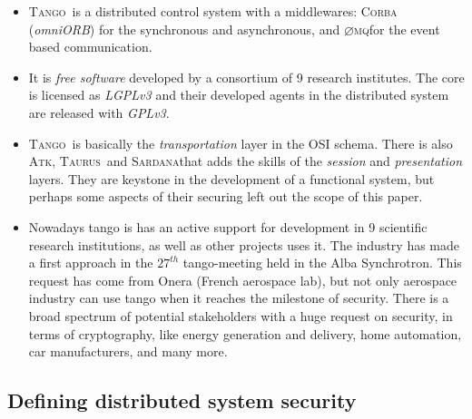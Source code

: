 \documentclass[10pt,a4paper,twoside]{llncs}
\newcommand{\tango}{\textsc{Tango}}
\newcommand{\sardana}{\textsc{Sardana}}
\newcommand{\taurus}{\textsc{Taurus}}
\newcommand{\atk}{\textsc{Atk}}
\newcommand{\zmq}{\textsc{$\varnothing$mq}}
\newcommand{\corba}{\textsc{Corba}}
\begin{document}
\begin{itemize}
    \item \tango\, is a distributed control system with a middlewares: \corba\, (\emph{omniORB}) for the synchronous and asynchronous, and \zmq for the event based communication.
    \item It is \emph{free software} developed by a consortium of 9 research institutes. The core is licensed as \emph{LGPLv3} and their developed agents in the distributed system are released with \emph{GPLv3}.
    \item \tango\, is basically the \emph{transportation} layer in the OSI schema. There is also \atk, \taurus\, and \sardana that adds the skills of the \emph{session} and \emph{presentation} layers. They are keystone in the development of a functional system, but perhaps some aspects of their securing left out the scope of this paper.
    \item Nowadays tango is has an active support for development in 9 scientific research institutions, as well as other projects uses it. The industry has made a first approach in the $27^{th}$ tango-meeting held in the Alba Synchrotron. This request has come from Onera (French aerospace lab), but not only aerospace industry can use tango when it reaches the milestone of security. There is a broad spectrum of potential stakeholders with a huge request on security, in terms of cryptography, like energy generation and delivery, home automation, car manufacturers, and many more.
\end{itemize}

%
\subsection{Defining distributed system security \label{sec:distributedSecuritySystems}}
\end{document}
